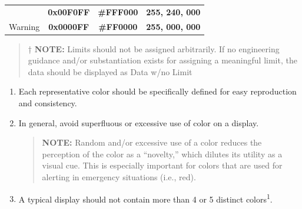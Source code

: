 \documentclass[
]{book}
\begin{document}
\begin{enumerate}
\begin{enumerate}
\begin{longtable}[]{@{}lccc@{}}
\begin{minipage}[t]{0.30\columnwidth}
    \end{minipage} & \begin{minipage}[t]{0.19\columnwidth}\centering
    \textbf{\colorbox[HTML]{000000}{\textcolor[HTML]{FFF000}{0x00F0FF}}}\strut
    \end{minipage} & \begin{minipage}[t]{0.19\columnwidth}\centering
    \textbf{\colorbox[HTML]{000000}{\textcolor[HTML]{FFF000}{#FFF000}}}\strut
    \end{minipage} & \begin{minipage}[t]{0.21\columnwidth}\centering
    \textbf{\colorbox[HTML]{000000}{\textcolor[HTML]{FFF000}{255, 240, 000}}}\strut
    \end{minipage}\tabularnewline
    \begin{minipage}[t]{0.30\columnwidth}\raggedright
    Warning\strut
    \end{minipage} & \begin{minipage}[t]{0.19\columnwidth}\centering
    \textbf{\colorbox[HTML]{000000}{\textcolor[HTML]{FF0000}{0x0000FF}}}\strut
    \end{minipage} & \begin{minipage}[t]{0.19\columnwidth}\centering
    \textbf{\colorbox[HTML]{000000}{\textcolor[HTML]{FF0000}{#FF0000}}}\strut
    \end{minipage} & \begin{minipage}[t]{0.21\columnwidth}\centering
    \textbf{\colorbox[HTML]{000000}{\textcolor[HTML]{FF0000}{255, 000, 000}}}\strut
    \end{minipage}\tabularnewline
    \bottomrule
    \end{longtable}

    \begin{quote}
    † \textbf{NOTE:} Limits should not be assigned arbitrarily. If no engineering guidance and/or substantiation exists for assigning a meaningful limit, the data should be displayed as Data w/no Limit
    \end{quote}

    \begin{enumerate}
    \def\labelenumiii{\arabic{enumiii}.}
    \setcounter{enumiii}{4}
    \item
      Each representative color should be specifically defined for easy reproduction and consistency.
    \item
      In general, avoid superfluous or excessive use of color on a display.

      \begin{quote}
      \textbf{NOTE:} Random and/or excessive use of a color reduces the perception of the color as a ``novelty,'' which dilutes its utility as a visual cue. This is especially important for colors that are used for alerting in emergency situations (i.e., red).
      \end{quote}
    \item
      A typical display should not contain more than 4 or 5 distinct colors\textsuperscript{1}.


\end{enumerate}
\end{enumerate}
\end{enumerate}
\end{document}
